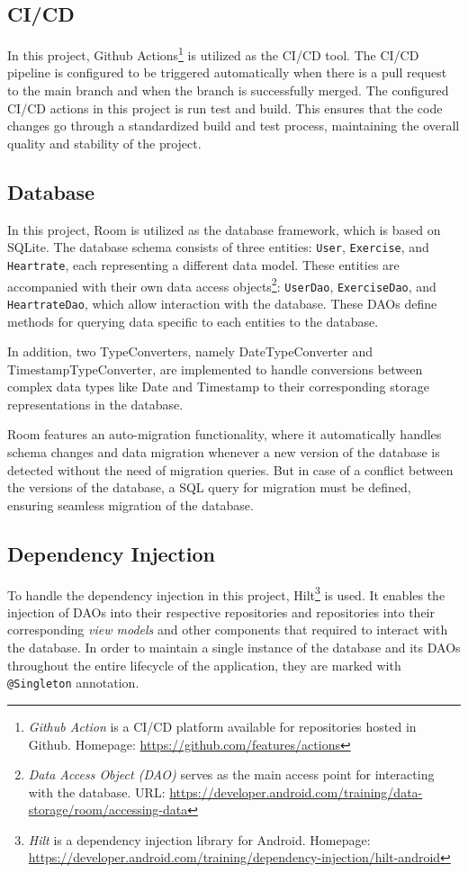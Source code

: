 \subsection{CI/CD}
In this project, Github Actions\footnote{\emph{Github Action} is a CI/CD platform available for repositories hosted in Github. Homepage: \url{https://github.com/features/actions}} is utilized as the CI/CD tool. 
The CI/CD pipeline is configured to be triggered automatically when there is a pull request to the main branch and when the branch is successfully merged. The configured CI/CD actions in this project is run test and build. 
This ensures that the code changes go through a standardized build and test process, maintaining the overall quality and stability of the project.

\subsection{Database}
In this project, Room is utilized as the database framework, which is based on SQLite.
The database schema consists of three entities: \texttt{User}, \texttt{Exercise}, and \texttt{Heartrate}, each representing a different data model.
These entities are accompanied with their own data access objects\footnote{\emph{Data Access Object (DAO)} serves as the main access point for interacting with the database. URL: \url{https://developer.android.com/training/data-storage/room/accessing-data}}: \texttt{UserDao}, \texttt{ExerciseDao}, and \texttt{HeartrateDao}, which allow interaction with the database. These DAOs define methods for querying data specific to each entities to the database.

In addition, two TypeConverters, namely DateTypeConverter and TimestampTypeConverter, are implemented to handle conversions between complex data types like Date and Timestamp to their corresponding storage representations in the database.

Room features an auto-migration functionality, where it automatically handles schema changes and data migration whenever a new version of the database is detected without the need of migration queries.
But in case of a conflict between the versions of the database, a SQL query for migration must be defined, ensuring seamless migration of the database.

\subsection{Dependency Injection}
To handle the dependency injection in this project, Hilt\footnote{\emph{Hilt} is a dependency injection library for Android. Homepage: \url{https://developer.android.com/training/dependency-injection/hilt-android}} is used. 
It enables the injection of DAOs into their respective repositories and repositories into their corresponding \emph{view models} and other components that required to interact with the database. 
In order to maintain a single instance of the database and its DAOs throughout the entire lifecycle of the application, they are marked with \texttt{@Singleton} annotation. 

